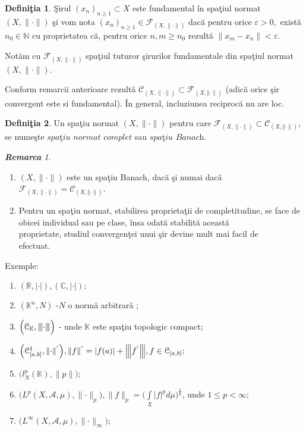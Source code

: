 \documentclass[ a4paper, 12pt]{report}
\theoremstyle{definition}
\newtheorem{definition}{\bf Defini\c tia}[section]
\theoremstyle{remark}
\newtheorem{remarc}{\bf Remarca}[section]
\numberwithin{equation}{section}
\begin{document}
\begin{definition}
\c Sirul $(x_n)_{n \geq 1} \subset X$ este fundamental \^in spa\c tiul normat $(X, \lVert \cdot \rVert)$ \c si vom nota $(x_n)_{n \geq 1} \in \mathcal{F}_{(X, \lVert \cdot \rVert)}$ dac\u a pentru orice $\varepsilon >0,$ exist\u a $n_0 \in \mathbb{N}$ cu proprietatea c\u a,  pentru orice $n,m \geq n_0$ rezult\u a $\lVert x_m - x_n \rVert < \varepsilon.$

\smallskip

Not\u am cu $\mathcal{F}_{(X, \lVert \cdot \rVert)}$ spa\c tiul tuturor \c sirurilor fundamentale din spa\c tiul normat $(X, \lVert \cdot \rVert)$.

\smallskip

Conform remarcii anterioare rezult\u a
$\mathcal{C}_{(X, \lVert \cdot \rVert)} \subset \mathcal{F}_{(X, \Vert \cdot \rVert)}$ (adic\u a orice \c sir convergent este si fundamental).
\^In general, incluziunea reciproc\u a nu are loc.
\end{definition}
\begin{definition}
Un spa\c tiu normat $(X, \lVert \cdot \rVert)$ pentru care $\mathcal{F}_{(X, \lVert \cdot \rVert)} \subset \mathcal{C}_{(X, \Vert \cdot \rVert)}$, se nume\c ste $\textit{spa\c tiu normat complet}$ sau $\textit{spa\c tiu Banach}$.
\end{definition}
\begin{remarc}
\begin{enumerate}
\item $(X, \lVert \cdot \rVert)$ este un spa\c tiu Banach, dac\u a \c si numai dac\u a $\mathcal{F}_{(X, \lVert \cdot \rVert)} = \mathcal{C}_{(X, \Vert \cdot \rVert)}$.
\item Pentru un spa\c tiu normat, stabilirea proprieta\c tii de completitudine, se face de obicei individual sau pe clase, \^insa odat\u a stabilit\u a aceast\u a\\
 proprietate, studiul convergen\c tei unui \c sir devine mult mai facil de \\
 efectuat.
\end{enumerate}
\end{remarc}
Exemple:
\begin{enumerate}
\item $(\mathbb{R}, \lvert \cdot \rvert), (\mathbb{C}, \lvert \cdot \rvert);$
\item $(\mathbb{K}^{n}, N)$ -$N$ o norm\u a arbitrar\u a ;
\item $\Big(\mathcal{C}_{\mathbb{K}}, {\left\vert\kern-0.25ex\left\vert\kern-0.25ex\left\vert \cdot \right\vert\kern-0.25ex\right\vert\kern-0.25ex\right\vert}\Big)$ - unde $\mathbb{K}$ este spa\c tiu topologic compact;
\item $\Big(\mathcal{C}_{[a,b]}^{1}, \lVert \cdot \rVert^{'}\Big), \lVert f \rVert^{'} = \lvert f(a) \rvert + {\left\vert\kern-0.25ex\left\vert\kern-0.25ex\left\vert f^{'} \right\vert\kern-0.25ex\right\vert\kern-0.25ex\right\vert}, f \in \mathcal{C}_{[a,b]};$
\item $\Big(l_{N}^{p}(\mathbb{K}), \lVert p \rVert\Big);$
\item $\Big( L^{p}(X,\mathcal{A}, \mu), \lVert \cdot \rVert_{p}  \Big), \lVert f \rVert_{p} = \Big( \int\limits_{X} \lvert f \rvert^{p} d\mu \Big )^{\frac{1}{p}}$, unde $1 \leq p < \infty;$
\item $\Big(  L^{\infty}(X,\mathcal{A},\mu), \lVert \cdot \rVert_{\infty}\Big);$
\end{enumerate}
\end{document}
